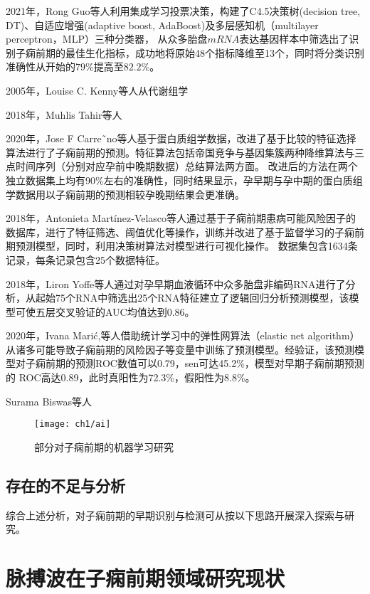 2021年，Rong Guo等人\cite{Guo2021}利用集成学习投票决策，构建了C4.5决策树(decision tree, DT)、自适应增强(adaptive boost, AdaBoost)及多层感知机（multilayer perceptron，MLP）三种分类器，
从众多胎盘$mRNA$表达基因样本中筛选出了识别子痫前期的最佳生化指标，成功地将原始48个指标降维至13个，同时将分类识别准确性从开始的$79\%$提高至$82.2\%$。

2005年，Louise C. Kenny等人从代谢组学

2018年，Muhlis Tahir\cite{Tahir2018}等人

2020年，Jose F Carre˜no等人\cite{Carreno2020}基于蛋白质组学数据，改进了基于比较的特征选择算法进行了子痫前期的预测。特征算法包括帝国竞争与基因集簇两种降维算法与三点时间序列（分别对应孕前中晚期数据）总结算法两方面。
改进后的方法在两个独立数据集上均有90\%左右的准确性，同时结果显示，孕早期与孕中期的蛋白质组学数据用以子痫前期的预测相较孕晚期结果会更准确。

2018年，Antonieta Martínez-Velasco等人\cite{Martinez2018}通过基于子痫前期患病可能风险因子的数据库，进行了特征筛选、阈值优化等操作，训练并改进了基于监督学习的子痫前期预测模型，同时，利用决策树算法对模型进行可视化操作。
数据集包含1634条记录，每条记录包含25个数据特征。

2018年，Liron Yoffe等人\cite{Yoffe2018}通过对孕早期血液循环中众多胎盘非编码RNA进行了分析，从起始75个RNA中筛选出25个RNA特征建立了逻辑回归分析预测模型，该模型可使五层交叉验证的AUC均值达到0.86。

2020年，Ivana Mari{\'{c}}\cite{Maric2020},等人借助统计学习中的弹性网算法（elastic net algorithm）从诸多可能导致子痫前期的风险因子等变量中训练了预测模型。经验证，该预测模型对子痫前期的预测ROC数值可以0.79，sen可达45.2\%，模型对早期子痫前期预测的
ROC高达0.89，此时真阳性为72.3\%，假阳性为8.8\%。

Surama Biswas等人

\begin{figure}[htbp]
    \centering
    \texttt{[image: ch1/ai]}
    \caption{\label{fig:ai}部分对子痫前期的机器学习研究}
\end{figure}

\subsection{存在的不足与分析}
综合上述分析，对子痫前期的早期识别与检测可从按以下思路开展深入探索与研究。


\section{脉搏波在子痫前期领域研究现状}
